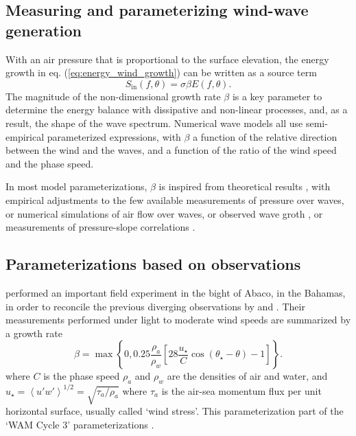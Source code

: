 

\subsection{Measuring and parameterizing wind-wave generation}
With an air pressure that is proportional to the surface elevation, the 
 energy growth in eq. (\ref{eq:energy_wind_growth}) can be written as a source term  
\begin{equation}
    S_{\mathrm{in}}\left(f,\theta\right)=\sigma \beta E\left(f,\theta\right).
\end{equation}
The magnitude of the non-dimensional growth rate $\beta$ is a key parameter 
to determine the energy balance with dissipative and non-linear processes, and, as a result, the shape of the wave spectrum. 
Numerical wave models all use semi-empirical parameterized expressions, with  $\beta$ a function of the relative direction between the wind and the waves, and a function
of the ratio of the wind speed and the phase speed. 

In most model parameterizations,   $\beta$ is inspired from theoretical results \citep[e.g.][]{Miles1959,Fabrikant1976,Miles1996b}, 
with empirical adjustments to the few 	available measurements of pressure over waves, or numerical simulations of air flow over waves, 
or observed wave groth \citep{Plant1982}, or measurements of pressure-slope correlations \citep{Snyder&al.1981,Donelan&al.2005b,Donelan&al.2006}.

\subsection{Parameterizations based on observations}
\cite{Snyder&al.1981} performed an important field experiment in the bight of Abaco, in the Bahamas, in order to 
reconcile the previous diverging observations by \cite{Dobson1971} and \cite{Snyder&Cox1966}. Their measurements performed under light to moderate 
wind speeds are summarized by a growth rate
\begin{equation}
    \beta=\max\left\{0,0.25 \frac{\rho_a}{\rho_w}\left[28\frac{u_\star}{C}
    \cos\left(\theta_\star - \theta\right)-1\right]\right\}.\label{Snyder}
\end{equation}
where $C$ is the phase speed $\rho_a$ and $\rho_w$ are the densities of air and water, and $u_\star=\left<u'w'\right>^{1/2}=\sqrt{\tau_a / \rho_a}$ where $\tau_a$ is the 
air-sea momentum flux per unit horizontal surface, usually called `wind stress'. 
This parameterization part of the  `WAM Cycle 3'  parameterizations \citep{WAMDI1988}. 

